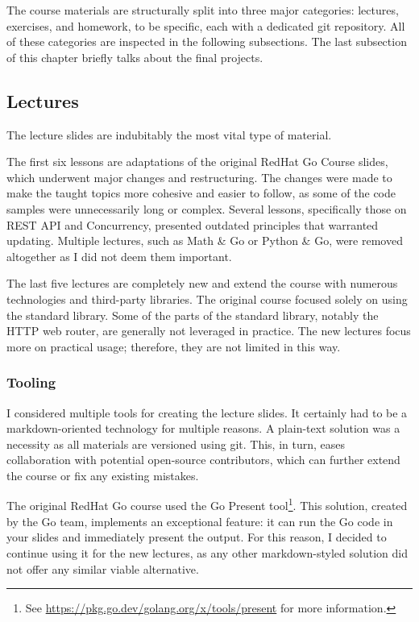 \documentclass[
  digital,
  color,
  oneside,
  nosansbold,
  nocolorbold,
  lof,
  lot,
]{fithesis4}
\begin{document}
The course materials are structurally split into three major categories: lectures, exercises, and homework, to be specific, each with a dedicated git repository. All of these categories are inspected in the following subsections. The last subsection of this chapter briefly talks about the final projects.

\subsection{Lectures}

The lecture slides are indubitably the most vital type of material. 

The first six lessons are adaptations of the original RedHat Go Course slides, which underwent major changes and restructuring. The changes were made to make the taught topics more cohesive and easier to follow, as some of the code samples were unnecessarily long or complex. Several lessons, specifically those on REST API and Concurrency, presented outdated principles that warranted updating. Multiple lectures, such as Math \& Go or Python \& Go, were removed altogether as I did not deem them important.

The last five lectures are completely new and extend the course with numerous technologies and third-party libraries. The original course focused solely on using the standard library. Some of the parts of the standard library, notably the HTTP web router, are generally not leveraged in practice. The new lectures focus more on practical usage; therefore, they are not limited in this way.

\subsubsection{Tooling}

I considered multiple tools for creating the lecture slides. It certainly had to be a markdown-oriented technology for multiple reasons. A plain-text solution was a necessity as all materials are versioned using git. This, in turn, eases collaboration with potential open-source contributors, which can further extend the course or fix any existing mistakes.

The original RedHat Go course used the Go Present tool\footnote{See \url{https://pkg.go.dev/golang.org/x/tools/present} for more information.}.
This solution, created by the Go team, implements an exceptional feature: it can run the Go code in your slides and immediately present the output. For this reason, I decided to continue using it for the new lectures, as any other markdown-styled solution did not offer any similar viable alternative.
\end{document}
